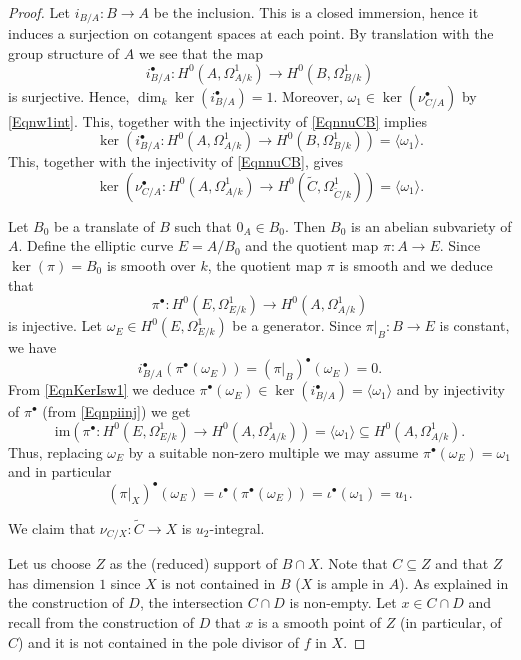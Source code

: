 \documentclass[11pt]{amsart}
\theoremstyle{remark}
\numberwithin{equation}{section}
\newcommand{\im}{\mathrm{im}}
\begin{document}
\begin{proof}
Let $i_{B/A}:B\to A$ be the inclusion. This is a closed immersion, hence it induces a surjection on cotangent spaces at each point. By translation with the group structure of $A$ we see that the map
$$
i_{B/A}^\bullet : H^0(A,\Omega^1_{A/k})\to H^0(B,\Omega^1_{B/k})
$$
is surjective. Hence, $\dim_k \ker(i_{B/A}^\bullet) = 1$. Moreover, $\omega_1\in\ker (\nu_{C/A}^\bullet)$ by \eqref{Eqnw1int}. This, together with the injectivity of \eqref{EqnnuCB} implies
\begin{equation}\label{EqnKerIsw1}
\ker \left(i_{B/A}^\bullet:H^0(A,\Omega^1_{A/k})\to H^0(B,\Omega^1_{B/k})\right) =\langle \omega_1\rangle.
\end{equation}
This, together with the injectivity of \eqref{EqnnuCB}, gives
\begin{equation}\label{EqnKerCA}
\ker \left(\nu_{C/A}^\bullet:H^0(A,\Omega^1_{A/k})\to H^0(\widetilde{C},\Omega^1_{\widetilde{C}/k})\right) =\langle \omega_1\rangle.
\end{equation}


Let $B_0$ be a translate of $B$ such that $0_A\in B_0$. Then $B_0$ is an abelian subvariety of $A$. Define the elliptic curve $E=A/B_0$ and the quotient map $\pi:A\to E$. Since $\ker(\pi)=B_0$ is smooth over $k$, the quotient map $\pi$ is smooth and we deduce that
\begin{equation}\label{Eqnpiinj}
\pi^\bullet: H^0(E,\Omega^1_{E/k})\to H^0(A,\Omega^1_{A/k})
\end{equation}
is injective. Let $\omega_E\in H^0(E,\Omega^1_{E/k})$ be a generator. Since $\pi|_B:B\to E$ is constant, we have 
$$
i_{B/A}^\bullet(\pi^\bullet(\omega_E))=(\pi|_B)^\bullet(\omega_E)=0.
$$
From \eqref{EqnKerIsw1} we deduce  $\pi^\bullet(\omega_E)\in \ker(i_{B/A}^\bullet)=\langle \omega_1\rangle$ and by injectivity of $\pi^\bullet$ (from \eqref{Eqnpiinj}) we get 
$$
\im\left(\pi^\bullet:H^0(E,\Omega^1_{E/k})\to H^0(A,\Omega^1_{A/k})\right)=\langle\omega_1\rangle\subseteq H^0(A,\Omega^1_{A/k}).
$$
Thus, replacing $\omega_E$ by a suitable non-zero multiple we may assume $\pi^\bullet(\omega_E)=\omega_1$ and in particular
\begin{equation}\label{EqnwE}
(\pi|_X)^\bullet(\omega_E)=\iota^\bullet(\pi^\bullet(\omega_E))=\iota^\bullet(\omega_1)=u_1.
\end{equation}



We claim that $\nu_{C/X}:\widetilde{C}\to X$ is $u_2$-integral. 


Let us choose $Z$  as the (reduced) support of $B\cap X$. Note that $C\subseteq Z$ and that $Z$ has dimension $1$ since $X$ is not contained in $B$ ($X$ is ample in $A$). As explained in the construction of $D$, the intersection $C\cap D$ is non-empty. Let $x\in C\cap D$ and recall from the construction of $D$ that $x$ is a smooth point of $Z$ (in particular, of $C$) and it is not contained in the pole divisor of $f$ in $X$.




\end{proof}
\end{document}
